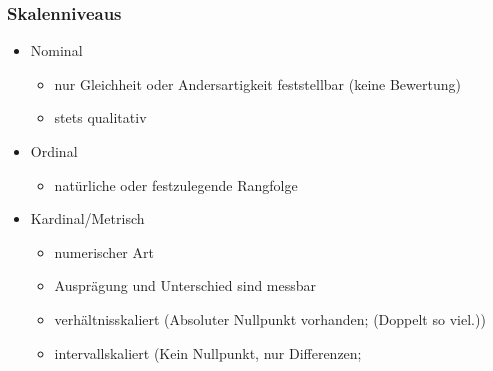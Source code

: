 \documentclass[a4paper]{article}
\begin{document}
\begin{landscape}
\begin{multicols}{4}
    \subsubsection*{Skalenniveaus}
    \begin{itemize}[noitemsep,nolistsep,leftmargin=*]
        \item Nominal
        \begin{itemize}[noitemsep,nolistsep,leftmargin=*]
            \item nur Gleichheit oder Andersartigkeit feststellbar (keine Bewertung)
            \item stets qualitativ
        \end{itemize}
        \item Ordinal
        \begin{itemize}[noitemsep,nolistsep,leftmargin=*]
            \item natürliche oder festzulegende Rangfolge
        \end{itemize}
        \item Kardinal/Metrisch
        \begin{itemize}[noitemsep,nolistsep,leftmargin=*]
            \item numerischer Art 
            \item Ausprägung und Unterschied sind messbar
            \item verhältnisskaliert (Absoluter Nullpunkt vorhanden; (Doppelt so viel.))
            \item intervallskaliert (Kein Nullpunkt, nur Differenzen;
        \end{itemize}
    \end{itemize}

\end{multicols}
\end{landscape}
\end{document}
